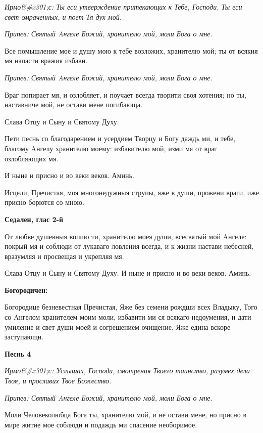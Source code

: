 \itshape Ирмо&#x301;с:\normalfont{} Ты еси утверждение притекающих к Тебе, Господи, Ты еси свет омраченных, и поет Тя дух мой.


\itshape Припев:\normalfont{} Святый Aнгеле Божий, хранителю мой, моли Бога о мне.


Все помышление мое и душу мою к тебе возложих, хранителю мой; ты от всякия мя напасти вражия избави.


\itshape Припев:\normalfont{} Святый Aнгеле Божий, хранителю мой, моли Бога о мне.


Враг попирает мя, и озлобляет, и поучает всегда творити своя хотения; но ты, наставниче мой, не остави мене погибающа.


Слава Отцу и Сыну и Святому Духу.


Пети песнь со благодарением и усердием Творцу и Богу даждь ми, и тебе, благому Aнгелу хранителю моему: избавителю мой, изми мя от враг озлобляющих мя.


И ныне и присно и во веки веков. Аминь.


Исцели, Пречистая, моя многонедужныя струпы, яже в души, прожени враги, иже присно борются со мною.




\bfseries Седален, глас 2-й\normalfont{}


От любве душевныя вопию ти, хранителю моея души, всесвятый мой Aнгеле: покрый мя и соблюди от лукаваго ловления всегда, и к жизни настави небесней, вразумляя и просвещая и укрепляя мя.


Слава Отцу и Сыну и Святому Духу. И ныне и присно и во веки веков. Аминь.




\bfseries Богородичен:\normalfont{}


Богородице безневестная Пречистая, Яже без семени рождши всех Владыку, Того со Aнгелом хранителем моим моли, избавити ми ся всякаго недоумения, и дати умиление и свет души моей и согрешением очищение, Яже едина вскоре заступающи.




\bfseries Песнь 4\normalfont{}


\itshape Ирмо&#x301;с:\normalfont{} Услышах, Господи, смотрения Твоего таинство, разумех дела Твоя, и прославих Твое Божество.


\itshape Припев:\normalfont{} Святый Aнгеле Божий, хранителю мой, моли Бога о мне.


Моли Человеколюбца Бога ты, хранителю мой, и не остави мене, но присно в мире житие мое соблюди и подаждь ми спасение необоримое.


